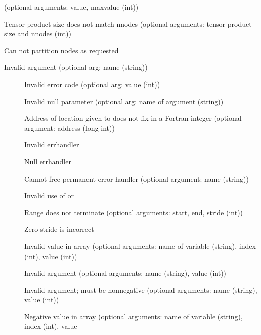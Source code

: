 \begin{description}
\begin{description}
      (optional arguments: value, maxvalue (int))
    \item[\mpidconst{MPIi_ERR_DIMS_TENSOR_SIZE}]Tensor product size does not
      match nnodes (optional arguments: tensor product size and nnodes (int))
    \item[\mpidconst{MPIi_ERR_DIMS_PARTITION}]Can not partition nodes as
      requested 
    \end{description}
\item[\mpiconst{MPI_ERR_ARG}]Invalid argument (optional arg: name (string))
    \begin{description}
    \item[]Invalid error code (optional arg:
      value (int))
    \item[]Invalid null parameter (optional arg:
      name of argument (string))
    \item[]Address of location given to
       does not fix in a Fortran integer (optional
      argument: address (long int))
    \item[]Invalid errhandler
    \item[]Null errhandler
    \item[]Cannot free permanent
      error handler (optional argument: name (string))
    \item[]Invalid use of
       or 
    \item[]Range does not terminate (optional
      arguments: start, end, stride (int))
    \item[]Zero stride is incorrect
    \item[]Invalid value in array (optional
      arguments: name of variable (string), index (int), value (int))
    \item[]Invalid argument (optional arguments:
      name (string), value (int))
    \item[]Invalid argument; must be
      nonnegative (optional arguments: name (string), value (int))
    \item[]Negative value in array
      (optional arguments: name of variable (string), index (int), value

\end{description}
\end{description}
